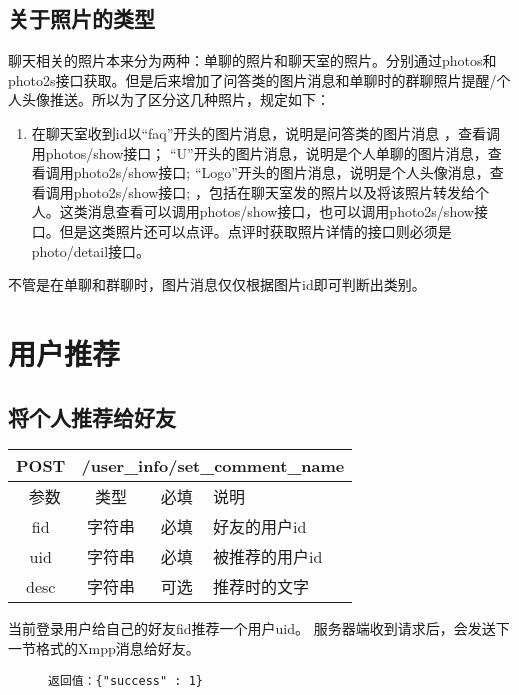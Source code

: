 \subsection{关于照片的类型}
聊天相关的照片本来分为两种：单聊的照片和聊天室的照片。分别通过photos和photo2s接口获取。但是后来增加了问答类的图片消息和单聊时的群聊照片提醒/个人头像推送。所以为了区分这几种照片，规定如下：
\begin{enumerate}
\item 在聊天室收到id以“faq”开头的图片消息，说明是问答类的图片消息 ，查看调用photos/show接口；
“U”开头的图片消息，说明是个人单聊的图片消息，查看调用photo2s/show接口;
“Logo”开头的图片消息，说明是个人头像消息，查看调用photo2s/show接口;
，包括在聊天室发的照片以及将该照片转发给个人。这类消息查看可以调用photos/show接口，也可以调用photo2s/show接口。但是这类照片还可以点评。点评时获取照片详情的接口则必须是photo/detail接口。
\end{enumerate}

不管是在单聊和群聊时，图片消息仅仅根据图片id即可判断出类别。






\section{用户推荐}
\subsection{ 将个人推荐给好友}
\begin{table}[H]
   \begin{center}
\begin{tabular}{|c|c|c|p{12cm}|}
\hline
POST & \multicolumn{3}{|c|}{/user\_info/set\_comment\_name} \\
\hline\hline
 \  参数  & 类型 & 必填 &  说明  \\
\hline
 fid  & 字符串 & 必填 &  好友的用户id\\
 \hline
 uid  & 字符串 & 必填 &  被推荐的用户id\\
\hline
 desc  & 字符串 & 可选 &  推荐时的文字\\
\hline
\end{tabular}
   \end{center}
\end{table}
当前登录用户给自己的好友fid推荐一个用户uid。
服务器端收到请求后，会发送下一节格式的Xmpp消息给好友。

\begin{figure}[H]
\begin{verbatim}
返回值：{"success" : 1}
\end{verbatim}
\end{figure}


